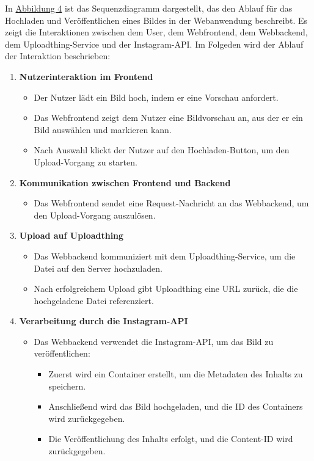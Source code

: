 In \hyperref[fig:fig-4]{Abbildung 4} ist das Sequenzdiagramm dargestellt, das den Ablauf für das Hochladen und Veröffentlichen eines Bildes in der Webanwendung beschreibt. Es zeigt die 
Interaktionen zwischen dem User, dem Webfrontend, dem Webbackend, dem Uploadthing-Service und der Instagram-\ac{API}. Im Folgeden wird der Ablauf der Interaktion beschrieben:

\begin{enumerate}
    \item \textbf{Nutzerinteraktion im Frontend}
    \begin{itemize}
        \item Der Nutzer lädt ein Bild hoch, indem er eine Vorschau anfordert.
        \item Das Webfrontend zeigt dem Nutzer eine Bildvorschau an, aus der er ein Bild auswählen und markieren kann.
        \item Nach Auswahl klickt der Nutzer auf den Hochladen-Button, um den Upload-Vorgang zu starten.
    \end{itemize}

    \item \textbf{Kommunikation zwischen Frontend und Backend}
    \begin{itemize}
        \item Das Webfrontend sendet eine Request-Nachricht an das Webbackend, um den Upload-Vorgang auszulösen.
    \end{itemize}

    \item \textbf{Upload auf Uploadthing}
    \begin{itemize}
        \item Das Webbackend kommuniziert mit dem Uploadthing-Service, um die Datei auf den Server hochzuladen.
        \item Nach erfolgreichem Upload gibt Uploadthing eine URL zurück, die die hochgeladene Datei referenziert.
    \end{itemize}

    \item \textbf{Verarbeitung durch die Instagram-\ac{API}}
    \begin{itemize}
        \item Das Webbackend verwendet die Instagram-\ac{API}, um das Bild zu veröffentlichen:
        \begin{itemize}
            \item Zuerst wird ein Container erstellt, um die Metadaten des Inhalts zu speichern.
            \item Anschließend wird das Bild hochgeladen, und die ID des Containers wird zurückgegeben.
            \item Die Veröffentlichung des Inhalts erfolgt, und die Content-ID wird zurückgegeben.
        \end{itemize}
    \end{itemize}


\end{enumerate}
